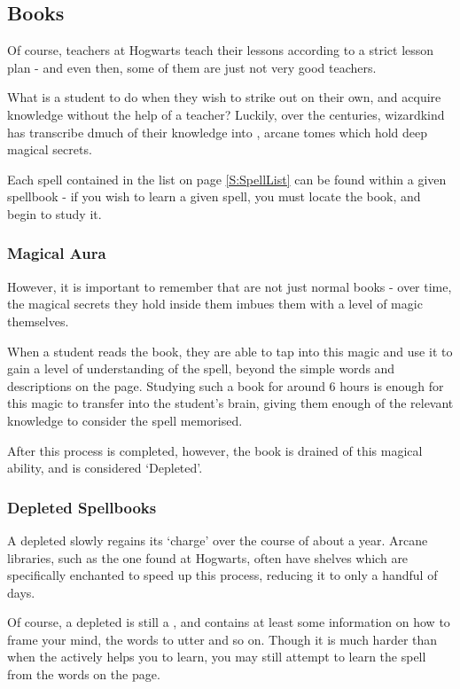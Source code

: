 \subsection{Books}

Of course, teachers at Hogwarts teach their lessons according to a strict lesson plan - and even then, some of them are just not very good teachers. 

What is a student to do when they wish to strike out on their own, and acquire knowledge without the help of a teacher? Luckily, over the centuries, wizardkind has transcribe dmuch of their knowledge into , arcane tomes which hold deep magical secrets. 

Each spell contained in the list on page \ref{S:SpellList} can be found within a given spellbook - if you wish to learn a given spell, you must locate the book, and begin to study it.
\subsubsection{Magical Aura}

However, it is important to remember that  are not just normal books - over time, the magical secrets they hold inside them imbues them with a level of magic themselves. 

When a student reads the book, they are able to tap into this magic and use it to gain a level of understanding of the spell, beyond the simple words and descriptions on the page. Studying such a book for around 6 hours is enough for this magic to transfer into the student's brain, giving them enough of the relevant knowledge to consider the spell memorised. 

After this process is completed, however, the book is drained of this magical ability, and is considered `Depleted'.


\subsubsection{Depleted Spellbooks}

A depleted  slowly regains its `charge' over the course of about a year. Arcane libraries, such as the one found at Hogwarts, often have shelves which are specifically enchanted to speed up this process, reducing it to only a handful of days. 

Of course, a depleted  is still a , and contains at least some information on how to frame your mind, the words to utter and so on. Though it is much harder than when the  actively helps you to learn, you may still attempt to learn the spell from the words on the page.

